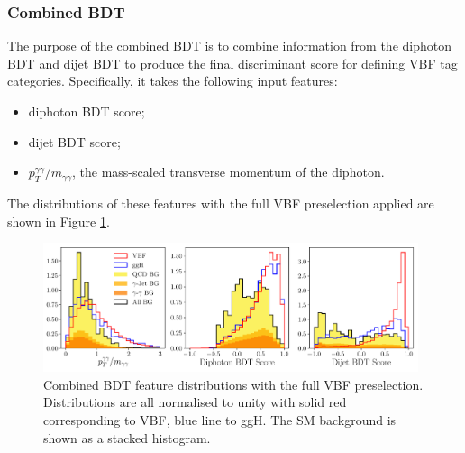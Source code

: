 \subsubsection{Combined BDT}
The purpose of the combined BDT is to combine information from the diphoton BDT and dijet BDT to produce the final discriminant score for defining VBF tag categories. 
Specifically, it takes the following input features:
\begin{itemize}[noitemsep]
    \item diphoton BDT score;
    \item dijet BDT score;
    \item $p_{T}^{\gamma\gamma}/m_{\gamma\gamma}$, the mass-scaled transverse momentum of the diphoton.
\end{itemize}
The distributions of these features with the full VBF preselection applied are shown in Figure \ref{fig:event_categorisaton:combined_bdt_features}.
\begin{figure}[h!]
    \includegraphics[width=0.98\textwidth]{figures/event_selection/combined_BDT_features_splitBG_PS.pdf}
    \caption{Combined BDT feature distributions with the full VBF preselection. Distributions are all normalised to unity with solid red corresponding to VBF, blue line to ggH. The SM background is shown as a stacked histogram.}
    \label{fig:event_categorisaton:combined_bdt_features}
\end{figure}

